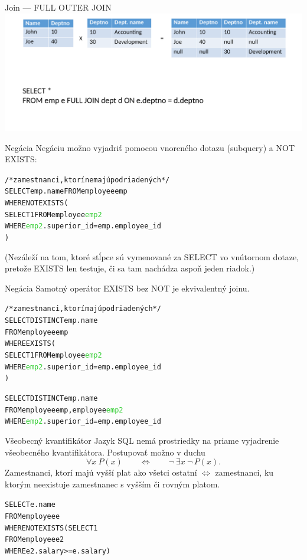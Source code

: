 \documentclass[12pt]{beamer}
\def\blue#1{\textcolor{Cerulean}{#1}}
\def\green#1{\textcolor{LimeGreen}{#1}}
\begin{document}
\begin{frame}{Join --- FULL OUTER JOIN}
\includegraphics[scale=.12]{join5}
\end{frame}

\begin{frame}[fragile]{Negácia}
Negáciu možno vyjadriť pomocou vnoreného dotazu (subquery) a \alert{NOT EXISTS}:
\begin{alltt}
/* zamestnanci, ktorí nemajú podriadených */
SELECT emp.name FROM employee \blue{emp}
WHERE \alert{NOT EXISTS} (
    SELECT 1 FROM employee \green{emp2}
    WHERE \green{emp2}.superior_id = \blue{emp}.employee_id
)
\end{alltt}
(Nezáleží na tom, ktoré stĺpce sú vymenované za SELECT vo vnútornom dotaze, pretože EXISTS len testuje, či sa tam nachádza aspoň jeden riadok.)
\end{frame}

\begin{frame}[fragile]{Negácia}
Samotný operátor EXISTS bez NOT je ekvivalentný joinu.
\begin{alltt}
/* zamestnanci, ktorí majú podriadených */
SELECT DISTINCT emp.name
FROM employee \blue{emp}
WHERE \alert{EXISTS} (
    SELECT 1 FROM employee \green{emp2}
    WHERE \green{emp2}.superior_id = \blue{emp}.employee_id
)

SELECT DISTINCT emp.name
FROM employee \blue{emp}, employee \green{emp2}
WHERE \green{emp2}.superior_id = \blue{emp}.employee_id
\end{alltt}
\end{frame}

\begin{frame}[fragile]{Všeobecný kvantifikátor}
Jazyk SQL nemá prostriedky na priame vyjadrenie všeobecného kvantifikátora.
Postupovať možno v duchu
$$
    \forall x\ P(x)\qquad \Leftrightarrow\qquad \lnot\ \exists x\ \lnot\, P(x).
$$
Zamestnanci, ktorí majú vyšší plat ako \alert{všetci} ostatní $\Leftrightarrow$ zamestnanci, ku ktorým neexistuje zamestnanec s vyšším či rovným platom.
\begin{alltt}
SELECT e.name
FROM employee e
WHERE \blue{NOT EXISTS} (SELECT 1
                  FROM employee e2
                  WHERE e2.salary >= e.salary)
\end{alltt}
\end{frame}
\end{document}
